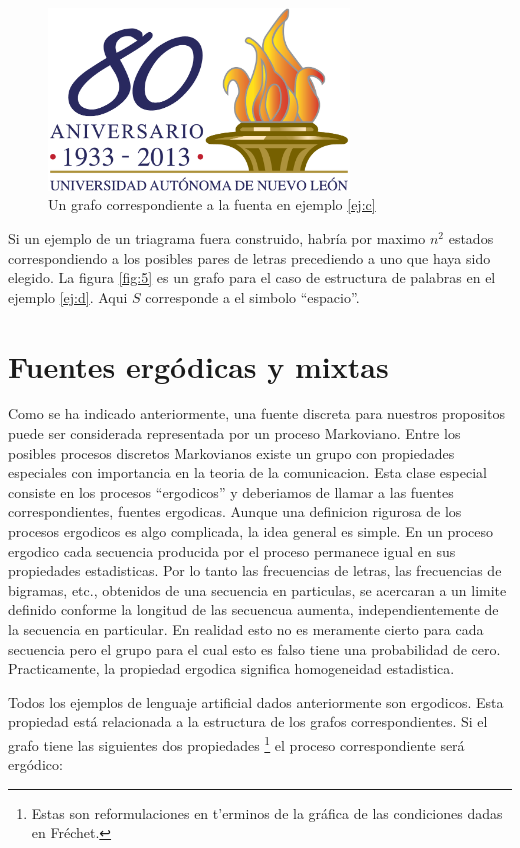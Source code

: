 \begin{figure}[!ht]
\centerline{\includegraphics[width=80mm]{ejemplo.png}}
\caption{Un grafo correspondiente a la fuenta en ejemplo \ref{ej:c}}
\label{fig:4}
\end{figure}

Si un ejemplo de un triagrama fuera construido, habr\'{i}a por maximo
$n^{2}$ estados correspondiendo a los posibles pares de letras
precediendo a uno que haya sido elegido. La figura \ref{fig:5} es un
grafo para el caso de estructura de palabras en el ejemplo
\ref{ej:d}. Aqui $S$ corresponde a el simbolo ``espacio''.

\clearpage

\chapter{Fuentes erg\'{o}dicas y mixtas}
\label{sec:5}

Como se ha indicado anteriormente, una fuente discreta para nuestros
propositos puede ser considerada representada por un proceso
Markoviano. Entre los posibles procesos discretos Markovianos existe
un grupo con propiedades especiales con importancia en la teoria de la
comunicacion. Esta clase especial consiste en los procesos
``ergodicos'' y deberiamos de llamar a las fuentes correspondientes,
fuentes ergodicas. Aunque una definicion rigurosa de los procesos
ergodicos es algo complicada, la idea general es simple. En un proceso
ergodico cada secuencia producida por el proceso permanece igual en
sus propiedades estadisticas. Por lo tanto las frecuencias de letras,
las frecuencias de bigramas, etc., obtenidos de una secuencia en
particulas, se acercaran a un limite definido conforme la longitud de
las secuencua aumenta, independientemente de la secuencia en
particular. En realidad esto no es meramente cierto para cada
secuencia pero el grupo para el cual esto es falso tiene una
probabilidad de cero. Practicamente, la propiedad ergodica significa
homogeneidad estadistica.

Todos los ejemplos de lenguaje artificial dados anteriormente son
ergodicos. Esta propiedad est\'{a} relacionada a la estructura de los
grafos correspondientes. Si el grafo tiene las siguientes dos
propiedades \footnote{Estas son reformulaciones en t'{e}rminos de la
  gr\'{a}fica de las condiciones dadas en Fr\'{e}chet.} el proceso
correspondiente ser\'{a} erg\'{o}dico:

